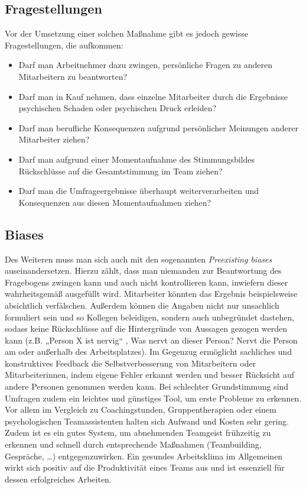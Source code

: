 \documentclass[a4paper,12pt,]{article}
\begin{document}
\subsection{Fragestellungen}
Vor der Umsetzung einer solchen Maßnahme gibt es jedoch gewisse Fragestellungen, die aufkommen: 
\begin{itemize}
\item Darf man Arbeitnehmer dazu zwingen, persönliche Fragen zu anderen Mitarbeitern zu beantworten?
\item  Darf man in Kauf nehmen, dass einzelne Mitarbeiter durch die Ergebnisse psychischen Schaden oder psychischen Druck erleiden?
\item  Darf man berufliche Konsequenzen aufgrund persönlicher Meinungen anderer Mitarbeiter ziehen?
\item  Darf man aufgrund einer Momentaufnahme des Stimmungsbildes Rückschlüsse auf die Gesamtstimmung im Team ziehen?
\item  Darf man die Umfrageergebnisse überhaupt weiterverarbeiten und Konsequenzen aus diesen Momentaufnahmen ziehen?
\end{itemize} 

\subsection{Biases}
Des Weiteren muss man sich auch mit den sogenannten \emph{Preexisting biases} auseinandersetzen. Hierzu zählt, dass man niemanden zur Beantwortung des Fragebogens zwingen kann und auch nicht kontrollieren kann, inwiefern dieser wahrheitsgemäß ausgefüllt wird. Mitarbeiter könnten das Ergebnis beispielsweise absichtlich verfälschen. Außerdem können die Angaben nicht nur unsachlich formuliert sein und so Kollegen beleidigen, sondern auch unbegründet dastehen, sodass keine Rückschlüsse auf die Hintergründe von Aussagen gezogen werden kann (z.B. „Person X ist nervig“ , Was nervt an dieser Person? Nervt die Person am oder außerhalb des Arbeitsplatzes). Im Gegenzug ermöglicht sachliches und konstruktives Feedback die Selbstverbesserung von Mitarbeitern oder Mitarbeiterinnen, indem eigene Fehler erkannt werden und besser Rücksicht auf andere Personen genommen werden kann.
Bei schlechter Grundstimmung sind Umfragen zudem ein leichtes und günstiges Tool, um erste Probleme zu erkennen. Vor allem im Vergleich zu Coachingstunden, Gruppentherapien oder einem psychologischen Teamassistenten halten sich Aufwand und Kosten sehr gering. 
Zudem ist es ein gutes System, um abnehmenden Teamgeist frühzeitig zu erkennen und schnell durch entsprechende Maßnahmen (Teambuilding, Gespräche, …) entgegenzuwirken.
Ein gesundes Arbeitsklima im Allgemeinen wirkt sich positiv auf die Produktivität eines Teams aus und ist essenziell für dessen erfolgreiches Arbeiten. 
\end{document}
